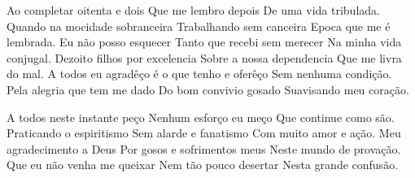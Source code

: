 \documentclass{article}
\begin{document}
\begin{poem}
	\begin{stanza}
    Ao completar oitenta e dois    \verseline
    Que me lembro depois           \verseline
    De uma vida tribulada.         \verseline
    Quando na mocidade sobranceira \verseline
    Trabalhando sem canceira       \verseline
    Epoca que me é lembrada.       \verseline
    Eu não posso esquecer          \verseline
    Tanto que recebi sem merecer   \verseline
    Na minha vida conjugal.        \verseline
    Dezoito filhos por excelencia  \verseline
    Sobre a nossa dependencia      \verseline
    Que me livra do mal.           \verseline
    A todos eu agradêço            \verseline
    é o que tenho e oferêço        \verseline
    Sem nenhuma condição.          \verseline
    Pela alegria que tem me dado   \verseline
    Do bom convivio gosado         \verseline
    Suavisando meu coração.
  \end{stanza}
\end{poem}

\begin{poem}
  \begin{stanza}
    A todos neste instante peço      \verseline
    Nenhum esforço eu meço           \verseline
    Que continue como são.           \verseline
    Praticando o espiritismo         \verseline
    Sem alarde e fanatismo           \verseline
    Com muito amor e ação.           \verseline
    Meu agradecimento a Deus         \verseline
    Por gosos e sofrimentos meus     \verseline
    Neste mundo de provação.         \verseline
    Que eu não venha me queixar      \verseline
    Nem tão pouco desertar           \verseline
    Nesta grande confusão.
  \end{stanza}
\end{poem}
\end{document}
